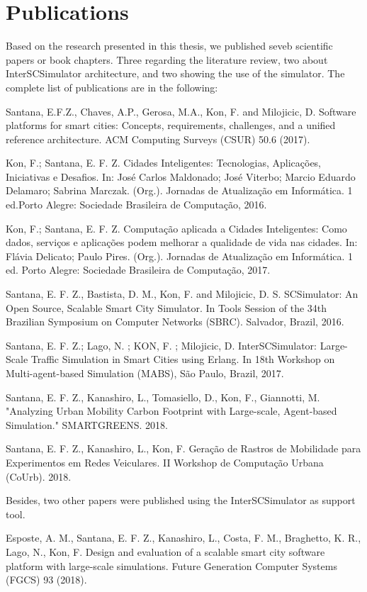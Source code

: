 \section{Publications}
\label{sec:publicacoes}

Based on the research presented in this thesis, we published seveb scientific papers or book chapters. Three regarding the literature review, two about InterSCSimulator architecture, and two showing the use of the simulator. The complete list of publications are in the following:

Santana, E.F.Z., Chaves, A.P., Gerosa, M.A., Kon, F. and Milojicic, D. Software platforms for smart cities: Concepts, requirements, challenges, and a unified reference architecture. ACM Computing Surveys (CSUR) 50.6 (2017).

Kon, F.; Santana, E. F. Z. Cidades Inteligentes: Tecnologias, Aplicações, Iniciativas e Desafios. In: José Carlos Maldonado; José Viterbo; Marcio Eduardo Delamaro; Sabrina Marczak. (Org.). Jornadas de Atualização em Informática. 1 ed.Porto Alegre: Sociedade Brasileira de Computação, 2016.

Kon, F.; Santana, E. F. Z. Computação aplicada a Cidades Inteligentes: Como dados, serviços e aplicações podem melhorar a qualidade de vida nas cidades. In: Flávia Delicato; Paulo Pires. (Org.). Jornadas de Atualização em Informática. 1 ed. Porto Alegre: Sociedade Brasileira de Computação, 2017.

Santana, E. F. Z., Bastista, D. M., Kon, F. and Milojicic, D. S. SCSimulator: An Open Source, Scalable Smart City Simulator. In Tools Session of the 34th Brazilian Symposium on Computer Networks (SBRC). Salvador, Brazil, 2016.

Santana, E. F. Z.; Lago, N. ; KON, F. ; Milojicic, D. InterSCSimulator: Large-Scale Traffic Simulation in Smart Cities using Erlang. In 18th Workshop on Multi-agent-based Simulation (MABS), São Paulo, Brazil, 2017.

Santana, E. F. Z., Kanashiro, L., Tomasiello, D., Kon, F., Giannotti, M. "Analyzing Urban Mobility Carbon Footprint with Large-scale, Agent-based Simulation." SMARTGREENS. 2018.

Santana, E. F. Z., Kanashiro, L., Kon, F. Geração de Rastros de Mobilidade para Experimentos em Redes Veiculares. II Workshop de Computação Urbana (CoUrb). 2018.

Besides, two other papers were published using the InterSCSimulator as support tool.

Esposte, A. M., Santana, E. F. Z., Kanashiro, L., Costa, F. M., Braghetto, K. R., Lago, N., Kon, F. Design and evaluation of a scalable smart city software platform with large-scale simulations. Future Generation Computer Systems (FGCS) 93 (2018).

